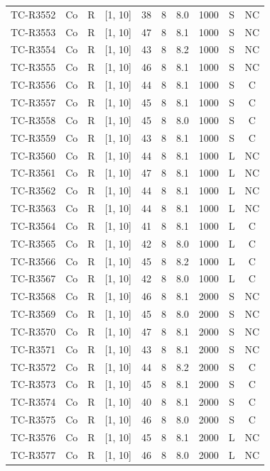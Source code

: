 \begin{longtable}{lccccccccc}
TC-R3552 & Co & R & [1, 10] & 38 & 8 & 8.0 & 1000 & S & NC \\
TC-R3553 & Co & R & [1, 10] & 47 & 8 & 8.1 & 1000 & S & NC \\
TC-R3554 & Co & R & [1, 10] & 43 & 8 & 8.2 & 1000 & S & NC \\
TC-R3555 & Co & R & [1, 10] & 46 & 8 & 8.1 & 1000 & S & NC \\
TC-R3556 & Co & R & [1, 10] & 44 & 8 & 8.1 & 1000 & S & C \\
TC-R3557 & Co & R & [1, 10] & 45 & 8 & 8.1 & 1000 & S & C \\
TC-R3558 & Co & R & [1, 10] & 45 & 8 & 8.0 & 1000 & S & C \\
TC-R3559 & Co & R & [1, 10] & 43 & 8 & 8.1 & 1000 & S & C \\
TC-R3560 & Co & R & [1, 10] & 44 & 8 & 8.1 & 1000 & L & NC \\
TC-R3561 & Co & R & [1, 10] & 47 & 8 & 8.1 & 1000 & L & NC \\
TC-R3562 & Co & R & [1, 10] & 44 & 8 & 8.1 & 1000 & L & NC \\
TC-R3563 & Co & R & [1, 10] & 44 & 8 & 8.1 & 1000 & L & NC \\
TC-R3564 & Co & R & [1, 10] & 41 & 8 & 8.1 & 1000 & L & C \\
TC-R3565 & Co & R & [1, 10] & 42 & 8 & 8.0 & 1000 & L & C \\
TC-R3566 & Co & R & [1, 10] & 45 & 8 & 8.2 & 1000 & L & C \\
TC-R3567 & Co & R & [1, 10] & 42 & 8 & 8.0 & 1000 & L & C \\
TC-R3568 & Co & R & [1, 10] & 46 & 8 & 8.1 & 2000 & S & NC \\
TC-R3569 & Co & R & [1, 10] & 45 & 8 & 8.0 & 2000 & S & NC \\
TC-R3570 & Co & R & [1, 10] & 47 & 8 & 8.1 & 2000 & S & NC \\
TC-R3571 & Co & R & [1, 10] & 43 & 8 & 8.1 & 2000 & S & NC \\
TC-R3572 & Co & R & [1, 10] & 44 & 8 & 8.2 & 2000 & S & C \\
TC-R3573 & Co & R & [1, 10] & 45 & 8 & 8.1 & 2000 & S & C \\
TC-R3574 & Co & R & [1, 10] & 40 & 8 & 8.1 & 2000 & S & C \\
TC-R3575 & Co & R & [1, 10] & 46 & 8 & 8.0 & 2000 & S & C \\
TC-R3576 & Co & R & [1, 10] & 45 & 8 & 8.1 & 2000 & L & NC \\
TC-R3577 & Co & R & [1, 10] & 46 & 8 & 8.0 & 2000 & L & NC \\

\end{longtable}
